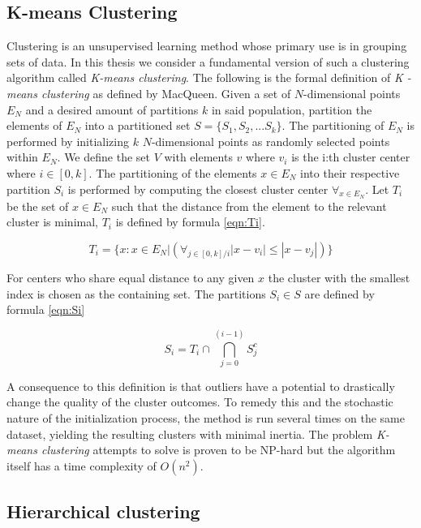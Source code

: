 \subsection{K-means Clustering}

Clustering is an unsupervised learning method whose primary use is in grouping sets of data. In this thesis we consider a fundamental version of such a clustering algorithm called \textit{K-means clustering}. The following is the formal definition of \textit{K - means clustering} as defined by MacQueen\cite{macqueen}. Given a set of $N$-dimensional points $E_N$ and a desired amount of partitions $k$ in said population, partition the elements of $E_N$ into a partitioned set $S = \{S_1, S_2, ... S_k\}$. The partitioning of $E_N$ is performed by initializing $k$  $N$-dimensional points as randomly selected points within $E_N$. We define the set $V$ with elements $v$ where $v_i$ is the i:th cluster center where $i \in [0, k]$. The partitioning of the elements $x \in E_N$ into their respective partition $S_i$ is performed by computing the closest cluster center $\forall_{x \in E_N}$. Let $T_i$ be the set of $x \in E_N$ such that the distance from the element to the relevant cluster is minimal, $T_i$ is defined by formula \ref{eqn:Ti}.

\begin{equation}
\label{eqn:Ti}
T_i = \{x : x \in E_N | (\forall_{j \in [0, k]/i } |x - v_i| \leq |x - v_j|)\} 
\end{equation}

For centers who share equal distance to any given $x$ the cluster with the smallest index is chosen as the containing set. The partitions $S_i \in S$ are defined by formula \ref{eqn:Si}

\begin{equation}
\label{eqn:Si}
S_i = T_i \cap \bigcap_{j=0}^{(i-1)} S_j^c
\end{equation}

A consequence to this definition is that outliers have a potential to drastically change the quality of the cluster outcomes\cite{chawla2013k}. To remedy this and the stochastic nature of the initialization process, the method is run several times on the same dataset, yielding the resulting clusters with minimal inertia. The problem \textit{K-means clustering} attempts to solve is proven to be NP-hard\cite{chawla2013k}\cite{mahajan2009planar} but the algorithm itself has a time complexity of $O(n^2)$\cite{pakhira2014linear}.


\subsection{Hierarchical clustering}

